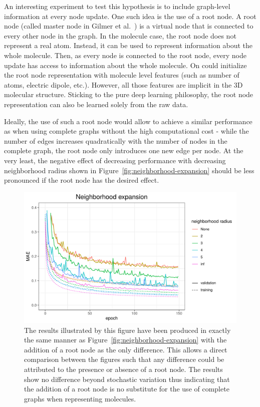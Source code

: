 An interesting experiment to test this hypothesis is to include graph-level information at every node update. One such idea is the use of a root node. A root node (called master node in Gilmer et al.~\cite{Gilmer2017}) is a virtual node that is connected to every other node in the graph. In the molecule case, the root node does not represent a real atom. Instead, it can be used to represent information about the whole molecule. Then, as every node is connected to the root node, every node update has access to information about the whole molecule. On could initialize the root node representation with molecule level features (such as number of atoms, electric dipole, etc.). However, all those features are implicit in the 3D molecular structure. Sticking to the pure deep learning philosophy, the root node representation can also be learned solely from the raw data.

Ideally, the use of such a root node would allow to achieve a similar performance as when using complete graphs without the high computational cost - while the number of edges increases quadratically with the number of nodes in the complete graph, the root node only introduces one new edge per node. At the very least, the negative effect of decreasing performance with decreasing neighborhood radius shown in Figure~\ref{fig:neighborhood-expansion} should be less pronounced if the root node has the desired effect.

\begin{figure}[H]
	\includegraphics[width=\linewidth]{figures/neighborhood-expansion-root-weight}
	\caption{The results illustrated by this figure have been produced in exactly the same manner as Figure~\ref{fig:neighborhood-expansion} with the addition of a root node as the only difference. This allows a direct comparison between the figures such that any difference could be attributed to the presence or absence of a root node. The results show no difference beyond stochastic variation thus indicating that the addition of a root node is no substitute for the use of complete graphs when representing molecules.}
	\label{fig:neighborhood-expansion-root-weight}
\end{figure}

